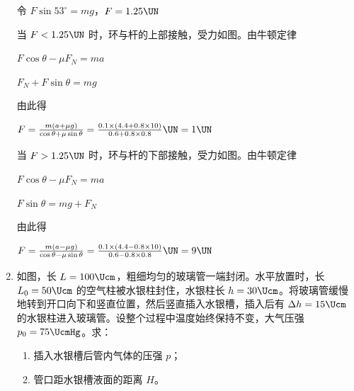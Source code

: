 \documentclass[\gkver]{gaokaozhenti}
\begin{document}
\begin{enumerate}
{令 $F\sin53^{\circ} = mg$，$F = 1.25\UN$

当 $F < 1.25\UN$ 时，环与杆的上部接触，受力如图。由牛顿定律

$F\cos\theta - \mu F_{N} = ma$

$F_{N} + F\sin\theta = mg$

由此得

$F = \frac{m(a + \mu g)}{\cos \theta  + \mu \sin \theta } = \frac{0.1 \times (4.4 + 0.8 \times 10)}{0.6 + 0.8 \times 0.8}\UN = 1\UN$

\onepicture[align=right, h=3.20cm]{}

当 $F > 1.25\UN$ 时，环与杆的下部接触，受力如图。由牛顿定律

$F\cos\theta - \mu F_{N} = ma$

$F\sin\theta = mg + F_{N}$

由此得

$F = \frac{m(a - \mu g)}{\cos \theta  - \mu \sin \theta } = \frac{0.1 \times (4.4 - 0.8 \times 10)}{0.6 - 0.8 \times 0.8}\UN = 9\UN$
}

\item
如图，长 $L = 100\Ucm$，粗细均匀的玻璃管一端封闭。水平放置时，长 $L_{0} = 50\Ucm$ 的空气柱被水银柱封住，水银柱长 $h = 30\Ucm$。将玻璃管缓慢地转到开口向下和竖直位置，然后竖直插入水银槽，插入后有 $\Delta h = 15\Ucm$ 的水银柱进入玻璃管。设整个过程中温度始终保持不变，大气压强 $p_{0} = 75\UcmHg$。求：
\begin{enumerate}
	\item
	插入水银槽后管内气体的压强 $p$；
	\item
	管口距水银槽液面的距离 $H$。
\end{enumerate}
\onepicture[align=right, w=3.76cm]{}
\jdanswer{
\begin{enumerate}
	\item
	$62.5\UcmHg$

	\item
	$27.5\Ucm$

\end{enumerate}
}
\end{enumerate}
\end{document}
